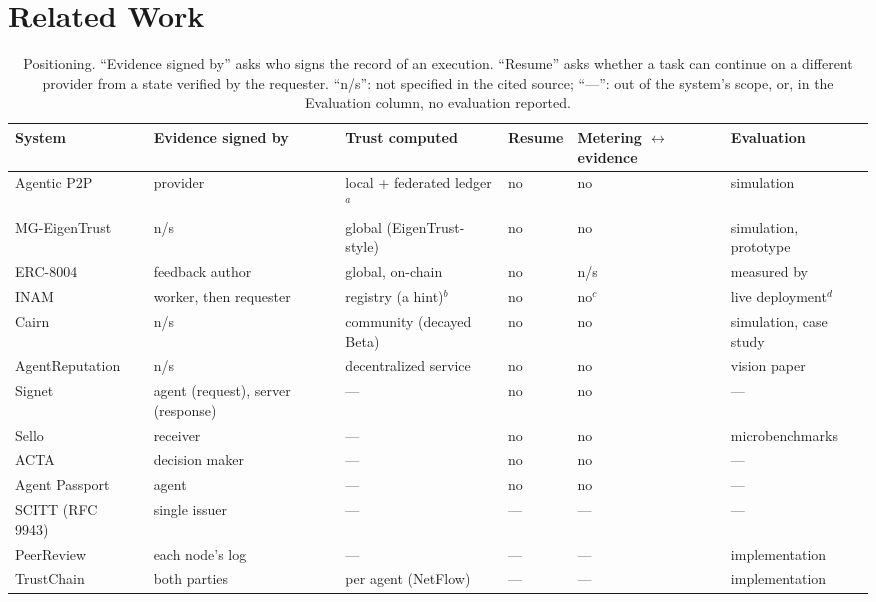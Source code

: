 \section{Related Work}
\label{sec:related}

\begin{table}[t]
\caption{Positioning. ``Evidence signed by'' asks who signs the record of
an execution. ``Resume'' asks whether a task can continue on a different
provider from a state verified by the requester. ``n/s'': not specified
in the cited source; ``---'': out of the system's scope, or, in the
Evaluation column, no evaluation reported.}
\label{tab:related}
\small
\begin{tabular}{@{}lllllp{3.2cm}@{}}
\toprule
System & Evidence signed by & Trust computed & Resume & Metering $\leftrightarrow$ evidence & Evaluation \\
\midrule
Agentic P2P~\cite{wang2026agenticp2p} & provider & local + federated ledger$^{a}$ & no & no & simulation \\
MG-EigenTrust~\cite{zhang2026distributed} & n/s & global (EigenTrust-style) & no & no & simulation, prototype \\
ERC-8004~\cite{erc8004} & feedback author & global, on-chain & no & n/s & measured by~\cite{xiong2026erc8004} \\
INAM~\cite{inam} & worker, then requester & registry (a hint)$^{b}$ & no & no$^{c}$ & live deployment$^{d}$ \\
Cairn~\cite{chard2026cairn} & n/s & community (decayed Beta) & no & no & simulation, case study \\
AgentReputation~\cite{chishti2026agentreputation} & n/s & decentralized service & no & no & vision paper \\
\midrule
Signet~\cite{signet} & agent (request), server (response) & --- & no & no & --- \\
Sello~\cite{figuera2026sello} & receiver & --- & no & no & microbenchmarks \\
ACTA~\cite{acta2026} & decision maker & --- & no & no & --- \\
Agent Passport~\cite{aps} & agent & --- & no & no & --- \\
SCITT (RFC 9943)~\cite{rfc9943} & single issuer & --- & --- & --- & --- \\
PeerReview~\cite{haeberlen2007peerreview} & each node's log & --- & --- & --- & implementation \\
TrustChain~\cite{otte2020trustchain} & both parties & per agent (NetFlow) & --- & --- & implementation \\

\end{tabular}
\end{table}
